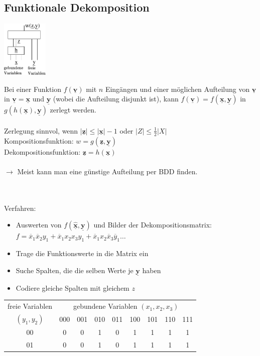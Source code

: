 \documentclass[6pt,a4paper]{scrartcl}
\renewcommand{\vec}[1]{\ensuremath{\underline{\boldsymbol {#1}}}}
\newcommand{\abs}[1]{\ensuremath{\left\vert#1\right\vert}} 							%
\newcommand{\ra}[0]{\ensuremath{\rightarrow}} 									%
\renewcommand{\vec}[1]{\ensuremath{\underline{\boldsymbol {#1}}}}
\begin{document}
\begin{multicols}{3}
\section{Funktionale Dekomposition} %
\label{sub:Funktionale Dekomposition}
\parbox{2.7cm}{ \includegraphics[width = 2.2cm]{img/ds/decomp.pdf} }
\parbox{6.0cm}{
Bei einer Funktion $f(\vec v)$ mit $n$ Eingängen und einer möglichen Aufteilung von $\vec v$ in $\vec v = \vec x$ und $\vec y$ (wobei die Aufteilung disjunkt ist), kann $f(\vec v) = f(\vec x, \vec y)$ in $g(h(\vec x), \vec y)$ zerlegt werden. \\
\\
Zerlegung sinnvol, wenn $\abs{\vec z} \le \abs{\vec x} -1$ oder $\abs{Z} \le \frac{1}{2} \abs{X}$ \\
Kompositionsfunktion: $w = g(\vec z, \vec y)$ \\
Dekompositionsfunktion: $\vec z = h(\vec x)$ \\
\\
$\ra $ Meist kann man eine günstige Aufteilung per BDD finden. }\\
\\
Verfahren:
\begin{itemize}
	\item Auswerten von $f(\vec{\hat x}, \vec y)$ und Bilder der Dekompositionsmatrix: \\
		$f = \overline x_1\overline x_2 y_1 + \overline x_1  x_2  x_3  y_1 + \overline x_1  x_2 \overline x_3  \overline y_1 \ldots$
	\item Trage die Funktionswerte in die Matrix ein
	\item Suche Spalten, die die selben Werte je $\vec y$ haben
	\item Codiere gleiche Spalten mit gleichem $z$
\end{itemize}
		\begin{tabular}{c | c | c | c | c | c | c | c | c }
			freie Variablen & \multicolumn{8}{c}{gebundene Variablen $(x_1, x_2, x_3)$}  \\
			 $(y_1, y_2)$ & 000 &  001 & 010 & 011 & 100 & 101 & 110 & 111  \\ \midrule
			00	& 0 & 0 & 1 & 0 & 1 & 1 & 1 & 1 \\
			01 & 0 & 0 & 1 & 0 & 1 & 1 & 1 & 1 \\

\end{tabular}
\end{multicols}
\end{document}
